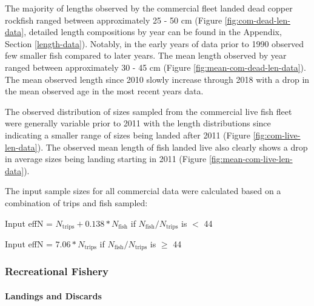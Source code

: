 \documentclass[11pt,
  english,
  letterpaper,
]{article}
\begin{document}
The majority of lengths observed by the commercial fleet landed dead copper rockfish ranged between approximately 25 - 50 cm (Figure \ref{fig:com-dead-len-data}, detailed length compositions by year can be found in the Appendix, Section \ref{length-data}). Notably, in the early years of data prior to 1990 observed few smaller fish compared to later years. The mean length observed by year ranged between approximately 30 - 45 cm (Figure \ref{fig:mean-com-dead-len-data}). The mean observed length since 2010 slowly increase through 2018 with a drop in the mean observed age in the most recent years data.

The observed distribution of sizes sampled from the commercial live fish fleet were generally variable prior to 2011 with the length distributions since indicating a smaller range of sizes being landed after 2011 (Figure \ref{fig:com-live-len-data}). The observed mean length of fish landed live also clearly shows a drop in average sizes being landing starting in 2011 (Figure \ref{fig:mean-com-live-len-data}).

The input sample sizes for all commercial data were calculated based on a combination of trips and fish sampled:

\begin{centering}

Input effN = $N_{\text{trips}} + 0.138 * N_{\text{fish}}$ if $N_{\text{fish}}/N_{\text{trips}}$ is $<$ 44

Input effN = $7.06 * N_{\text{trips}}$ if $N_{\text{fish}}/N_{\text{trips}}$ is $\geq$ 44

\end{centering}

\hypertarget{recreational-fishery}{%
\subsubsection{Recreational Fishery}\label{recreational-fishery}}

\hypertarget{landings-and-discards-1}{%
\paragraph{Landings and Discards}\label{landings-and-discards-1}}

\hfill\break
\end{document}
